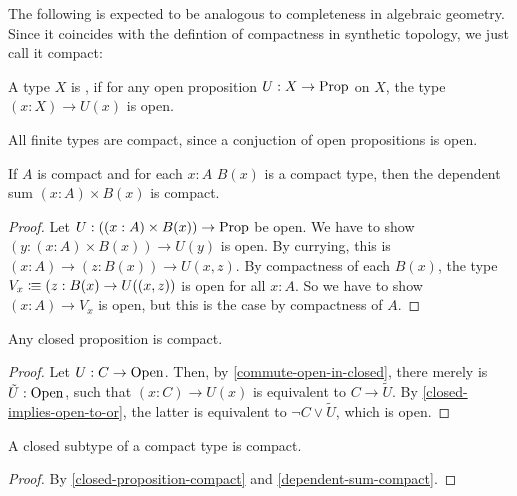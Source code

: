 
The following is expected to be analogous to completeness in algebraic geometry.
Since it coincides with the defintion of compactness in synthetic topology,
we just call it compact:

\begin{definition}
  A type $X$ is ,
  if for any open proposition $U:X\to\mathrm{Prop}$ on $X$,
  the type $(x:X)\to U(x)$ is open.
\end{definition}

\begin{example}
  All finite types are compact, since a conjuction of open propositions is open.
\end{example}

\begin{lemma}
  \label{dependent-sum-compact}
  If $A$ is compact and for each $x:A$ $B(x)$ is a compact type,
  then the dependent sum $(x:A)\times B(x)$ is compact.
\end{lemma}

\begin{proof}
  Let $U:((x:A)\times B(x))\to\mathrm{Prop}$ be open.
  We have to show $(y:(x:A)\times B(x))\to U(y)$ is open.
  By currying, this is $(x:A)\to (z:B(x))\to U(x,z)$.
  By compactness of each $B(x)$, the type $V_x\vcentcolon\mspace{-1.2mu}\equiv (z:B(x)\to U((x,z))$ is open for all $x:A$.
  So we have to show $(x:A)\to V_x$ is open, but this is the case by compactness of $A$.
\end{proof}

\begin{lemma}
  \label{closed-proposition-compact}
  Any closed proposition is compact.
\end{lemma}

\begin{proof}
  Let $U:C\to\mathrm{Open}$.
  Then, by \cref{commute-open-in-closed}, there merely is $\tilde{U}:\mathrm{Open}$,
  such that $(x:C)\to U(x)$ is equivalent to $C\to\tilde{U}$.
  By \cref{closed-implies-open-to-or}, the latter is equivalent to $\neg C\vee \tilde{U}$,
  which is open.
\end{proof}

\begin{lemma}
  \label{closed-subtype-compact}
  A closed subtype of a compact type is compact.
\end{lemma}

\begin{proof}
  By \cref{closed-proposition-compact} and \cref{dependent-sum-compact}.
\end{proof}


